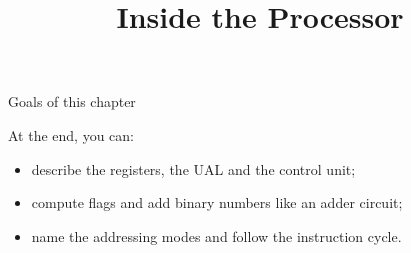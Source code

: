 \documentclass[aspectratio=169, 11pt, t, xcolor={table}]{beamer}
\title[Ch. 2: Inside the processor]{Inside the Processor}
\begin{document}

\begin{frame}{Goals of this chapter}
    \begin{tbox}{\faBullseye\quad At the end, you can:}
        \begin{itemize}
            \item describe the registers, the UAL and the control unit;
            \item compute flags and add binary numbers like an adder circuit;
            \item name the addressing modes and follow the instruction cycle.
        \end{itemize}
    \end{tbox}
\end{frame}
\end{document}
